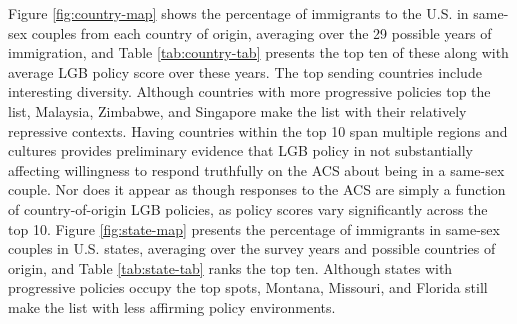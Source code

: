 \documentclass[
  12pt,
]{article}
\begin{document}
Figure \ref{fig:country-map} shows the percentage of immigrants to the U.S. in same-sex couples from each country of origin, averaging over the 29 possible years of immigration, and Table \ref{tab:country-tab} presents the top ten of these along with average LGB policy score over these years. The top sending countries include interesting diversity. Although countries with more progressive policies top the list, Malaysia, Zimbabwe, and Singapore make the list with their relatively repressive contexts. Having countries within the top 10 span multiple regions and cultures provides preliminary evidence that LGB policy in not substantially affecting willingness to respond truthfully on the ACS about being in a same-sex couple. Nor does it appear as though responses to the ACS are simply a function of country-of-origin LGB policies, as policy scores vary significantly across the top 10. Figure \ref{fig:state-map} presents the percentage of immigrants in same-sex couples in U.S. states, averaging over the survey years and possible countries of origin, and Table \ref{tab:state-tab} ranks the top ten. Although states with progressive policies occupy the top spots, Montana, Missouri, and Florida still make the list with less affirming policy environments.

 
  \providecommand{\huxb}[2]{\arrayrulecolor[RGB]{#1}\global\arrayrulewidth=#2pt}
  \providecommand{\huxvb}[2]{\color[RGB]{#1}\vrule width #2pt}
  \providecommand{\huxtpad}[1]{\rule{0pt}{#1}}
  \providecommand{\huxbpad}[1]{\rule[-#1]{0pt}{#1}}
\end{document}
